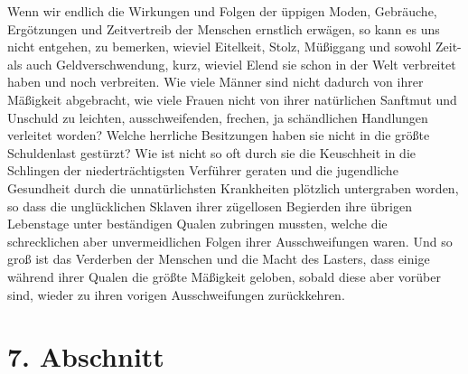 Wenn wir endlich die Wirkungen und Folgen der üppigen Moden, Gebräuche,
Ergötzungen und Zeitvertreib der Menschen ernstlich erwägen, so kann es uns
nicht entgehen, zu bemerken, wieviel Eitelkeit, Stolz, Müßiggang und sowohl
Zeit- als auch Geldverschwendung, kurz, wieviel Elend sie schon in der Welt
verbreitet haben und noch verbreiten. Wie viele Männer sind nicht dadurch von
ihrer Mäßigkeit abgebracht, wie viele Frauen nicht von ihrer natürlichen
Sanftmut und Unschuld zu leichten, ausschweifenden, frechen, ja schändlichen
Handlungen verleitet worden? Welche herrliche Besitzungen haben sie nicht in die
größte Schuldenlast gestürzt? Wie ist nicht so oft durch sie die Keuschheit in
die Schlingen der niederträchtigsten Verführer geraten und die jugendliche
Gesundheit durch die unnatürlichsten Krankheiten plötzlich untergraben worden,
so dass die unglücklichen Sklaven ihrer zügellosen
Begierden ihre
übrigen
Lebenstage unter beständigen Qualen zubringen mussten, welche die schrecklichen
aber unvermeidlichen Folgen ihrer Ausschweifungen waren. Und so groß ist das
Verderben der Menschen und die Macht des Lasters, dass einige während ihrer
Qualen die größte Mäßigkeit geloben, sobald diese aber vorüber sind, wieder zu
ihren vorigen Ausschweifungen zurückkehren.

\section{7. Abschnitt} \label{kap18_ab7}

